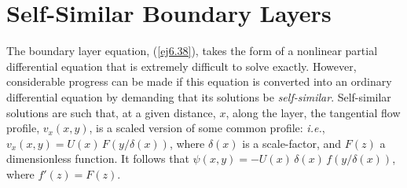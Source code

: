 \section{Self-Similar  Boundary Layers}\label{sssim}
The boundary layer equation, (\ref{ej6.38}),  takes the form of  a nonlinear partial
differential equation that is extremely difficult to solve exactly. However, considerable progress can be made if 
this equation is converted into an ordinary differential equation by demanding that its solutions be
{\em self-similar}.  Self-similar solutions are such that, at a given distance, $x$, along the layer, the tangential flow profile, $v_x(x,y)$,  is
 a scaled version of some common profile: {\em i.e.}, $v_x(x,y)= U(x)\,F(y/\delta(x))$, where $\delta(x)$ is a scale-factor, and $F(z)$
 a dimensionless function. It follows that $\psi(x,y)=-U(x)\,\delta(x)\,f(y/\delta(x))$, where $f'(z)=F(z)$. 

